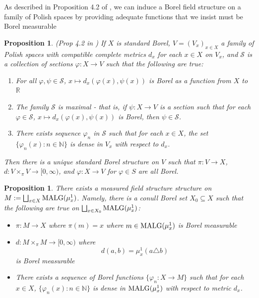 \documentclass{article}
\newcommand{\N}{\mathbb{N}}
\newcommand{\malg}[1]{\textmd{MALG}(#1)}
\newtheorem{proposition}[theorem]{Proposition}
\theoremstyle{definition}
\begin{document}
\noindent As described in Proposition 4.2 of \cite{borelfieldpaper}, we can induce a Borel field structure on a family of Polish spaces by providing adequate functions that we insist must be Borel measurable
\begin{proposition}\label{prop 4.2}
    (Prop 4.2 in \cite{borelfieldpaper}) If $ X $ is standard Borel, $ V = (V_x)_{x\in X} $ a family of Polish spaces with compatible complete metrics $ d_x $ for each $ x\in X $ on $ V_x $, and $ \mathcal{S} $ is a collection of sections $ \varphi:X\rightarrow V $ such that the following are true:
    \begin{enumerate}
        \item For all $ \varphi,\psi\in \mathcal{S} $, $ x\mapsto d_x(\varphi(x),\psi(x)) $ is Borel as a function from $ X $ to $ \mathbb{R} $
        \item The family $ \mathcal{S} $ is maximal - that is, if $ \psi:X\rightarrow V $ is a section such that for each $ \varphi\in \mathcal{S} $, $ x\mapsto d_x(\varphi(x),\psi(x)) $ is Borel, then $ \psi\in \mathcal{S }$. 
        \item There exists sequence $ \varphi_n $ in $ \mathcal{S} $ such that for each $ x\in X $, the set $ \{\varphi_n(x):n\in \N\} $ is dense in $ V_x $ with respect to $ d_x $. 
    \end{enumerate}
    Then there is a unique standard Borel structure on $ V $ such that $ \pi:V\rightarrow X$, $ d:V\times_\pi V \rightarrow[0,\infty) $, and $ \varphi:X\rightarrow V $ for $ \varphi\in S $ are all Borel. 
\end{proposition}
\begin{proposition}\label{borelonmalg}
    There exists a measured field structure structure on $ M:=\bigsqcup_{x\in X} \malg{\mu_x^1} $. Namely, there is a conull Borel set $ X_0\subseteq X $ such that the following are true on $ \bigsqcup_{x\in X_{0}}\malg{\mu_x^1} $:
    \begin{itemize}
        \item $ \pi: M\rightarrow X $ where $ \pi(m) = x $ where $ m\in \malg{\mu_x^1} $ is Borel measurable
        \item $ d:M\times_\pi M \rightarrow [0,\infty) $ where 
        \[
        d(a,b) = \mu_x^1(a\triangle b) 
        \]
        is Borel measurable
        \item There exists a sequence of Borel functions $ \{\varphi_n:X\rightarrow M \} $ such that for each $ x\in X $, $ \{\varphi_n(x):n\in \N\} $ is dense in $ \malg{\mu_x^1} $ with respect to metric $ d_x $. 
    \end{itemize} 
\end{proposition}
\end{document}

